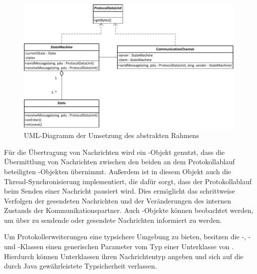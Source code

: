 \begin{figure}
	\centering
	\includegraphics[scale=0.9]{Diagrams/uml/abstract_pdu_state_machine_channel.pdf} %
	\caption{UML-Diagramm der Umsetzung des abstrakten Rahmens}
	\label{fig_uml_abstract_state_machine}
\end{figure}

Für die Übertragung von Nachrichten wird ein -Objekt genutzt, dass die Übermittlung von Nachrichten zwischen den beiden an dem Protokollablauf beteiligten -Objekten übernimmt. Außerdem ist in diesem Objekt auch die Thread-Synchronisierung implementiert, die dafür sorgt, dass der Protokollablauf beim Senden einer Nachricht pausiert wird. Dies ermöglicht das schrittweise Verfolgen der gesendeten Nachrichten und der Veränderungen des internen Zustands der Kommunikationspartner. Auch -Objekte können beobachtet werden, um über zu sendende oder gesendete Nachrichten informiert zu werden.

Um Protokollerweiterungen eine typsichere Umgebung zu bieten, besitzen die \nobreakdash-, - und -Klassen einen generischen Parameter vom Typ einer Unterklasse von . Hierdurch können Unterklassen ihren Nachrichtentyp angeben und sich auf die durch Java gewährleistete Typsicherheit verlassen.

